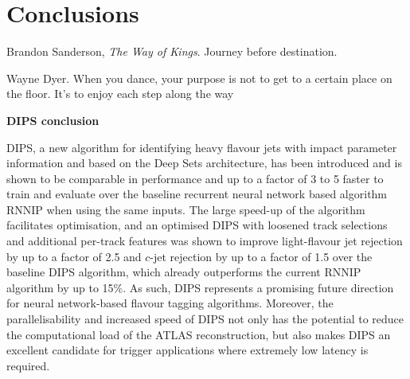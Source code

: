 \chapter{Conclusions}

\begin{chapquote}{Brandon Sanderson, \emph{The Way of Kings}.}
{Journey before destination.}
\end{chapquote}

\begin{chapquote}{Wayne Dyer.}
{When you dance, your purpose is not to get to a certain place on the floor. It's to enjoy each step along the way}
\end{chapquote}

\textbf{DIPS conclusion}

DIPS, a new algorithm for identifying heavy flavour jets with impact parameter information and based on the Deep Sets architecture, has been introduced and is shown to be comparable in performance and up to a factor of 3 to 5 faster to train and evaluate over the baseline recurrent neural network based algorithm RNNIP when using the same inputs. 
The large speed-up of the algorithm facilitates optimisation, and an optimised DIPS with loosened track selections and additional per-track features was shown to improve light-flavour jet rejection by up to a factor of 2.5 and $c$-jet rejection by up to a factor of 1.5 over the baseline DIPS algorithm, which already outperforms the current RNNIP algorithm by up to 15\%. 
As such, DIPS represents a promising future direction for neural network-based flavour tagging algorithms. 
Moreover, the parallelisability and increased speed of DIPS not only has the potential to reduce the computational load of the ATLAS reconstruction, but also makes DIPS an excellent candidate for trigger applications where extremely low latency is required.
